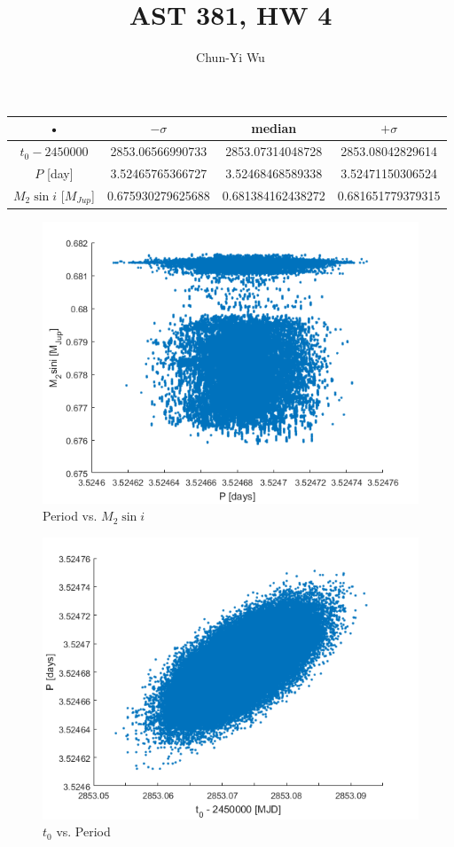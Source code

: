 \documentclass[10pt,letterpaper]{report}
\author{Chun-Yi Wu}
\title{AST 381, HW 4}
\begin{document}
\maketitle


\begin{tabular}{|c|c|c|c|}
\hline 
• & $-\sigma$ & median & $+\sigma$ \\ 
\hline 
$t_0-2450000$ & 2853.06566990733 & 2853.07314048728 & 2853.08042829614 \\ 
\hline 
$P$ [day] & 3.52465765366727 & 3.52468468589338 & 3.52471150306524 \\ 
\hline 
$M_2\sin{i}$ [$M_{Jup}$] & 0.675930279625688 & 0.681384162438272 & 0.681651779379315 \\ 
\hline 
\end{tabular} 

\begin{figure} [h]
\includegraphics[scale=1]{scatter_PM.png}
\caption{Period vs. $M_2\sin{i}$}
\end{figure}

\begin{figure} [h]
\includegraphics[scale=1]{scatter_t0P.png}
\caption{$t_0$ vs. Period}
\end{figure}
\end{document}
